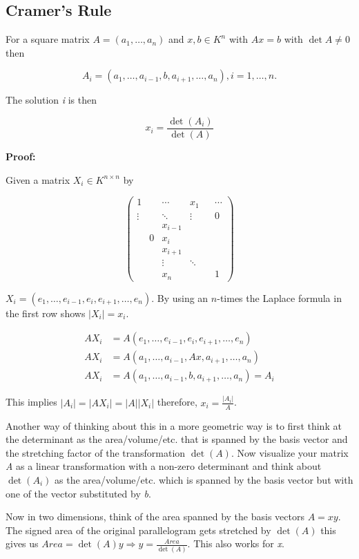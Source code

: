 \subsection{Cramer's Rule}

For a square matrix \(A = (a_1, \dots, a_n)\) and \(x,b \in K^{n}\) with \(Ax = b\) with \(\det A \ne 0\) 
then

\[
	A_i = (a_1, \dots, a_{i - 1}, b, a_{i + 1}, \dots, a_n), i = 1,\dots,n.
\]

The solution \emph{i} is then

\[
	x_i = \frac{\det(A_i)}{\det(A)}
\]

\textbf{Proof:}

Given a matrix \(X_i \in K^{n \times n}\) by

\[
	\begin{pmatrix}
		1  &  &\cdots     & x_1    & &\cdots \\
	\vdots &  &\ddots     & \vdots & & 0     \\
		&  &x_{i - 1}  &        & &       \\
		&0 & x_i 	  &		   & &       \\
		&  & x_{i + 1} &        & &       \\
		&  & \vdots    & \ddots & &       \\
		&  & x_n       &        & &    1   
	\end{pmatrix}
\]

\(X_i = (e_1, \dots, e_{i - 1}, e_i, e_{i + 1}, \dots, e_n)\). By using an \(n\)-times the 
Laplace formula in the first row shows \(|X_i| = x_i\).

\begin{align*}
	A X_i &= A (e_1, \dots, e_{i - 1}, e_i, e_{i + 1}, \dots, e_n)\\
	A X_i &= A (a_1, \dots, a_{i - 1}, Ax, a_{i + 1}, \dots, a_n)\\
	A X_i &= A (a_1, \dots, a_{i - 1}, b, a_{i + 1}, \dots, a_n) = A_i
\end{align*}

This implies \(|A_i| = |AX_i| = |A||X_i|\) therefore, \(x_i = \frac{|A_i|}{A}\).

\QED

Another way of thinking about this in a more geometric way is to first think at the determinant as 
the area/volume/etc. that is spanned by the basis vector and the stretching factor of the transformation 
\(\det(A)\). Now visualize your matrix \emph{A} as a linear transformation with 
a non-zero determinant and think about \(\det(A_i)\) as the area/volume/etc. which is spanned by the 
basis vector but with one of the vector substituted by \emph{b}.
\vspace{\baselineskip}

Now in two dimensions, think of the area spanned by the basis vectors \(A = xy\). 
The signed area of the original parallelogram gets 
stretched by \(\det(A)\) this gives us \(Area = \det(A)y \Rightarrow y = \frac{Area}{\det(A)}\). This 
also works for \emph{x}.
